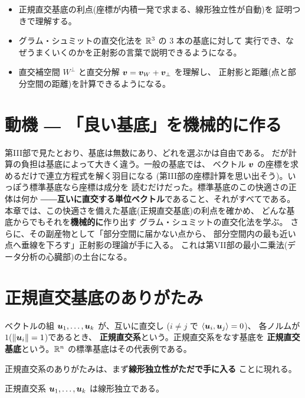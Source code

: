 \begin{goal}
\begin{itemize}
\item 正規直交基底の利点(座標が内積一発で求まる、線形独立性が自動)を
証明つきで理解する。
\item グラム・シュミットの直交化法を $\mathbb{R}^3$ の $3$ 本の基底に対して
実行でき、なぜうまくいくのかを正射影の言葉で説明できるようになる。
\item 直交補空間 $W^{\perp}$ と直交分解
$\bm{v} = \bm{v}_W + \bm{v}_{\perp}$ を理解し、
正射影と距離(点と部分空間の距離)を計算できるようになる。
\end{itemize}
\end{goal}

\section{動機 ― 「良い基底」を機械的に作る}

第III部で見たとおり、基底は無数にあり、どれを選ぶかは自由である。
だが計算の負担は基底によって大きく違う。一般の基底では、
ベクトル $\bm{v}$ の座標を求めるだけで連立方程式を解く羽目になる
(第III部の座標計算を思い出そう)。いっぽう標準基底なら座標は成分を
読むだけだった。標準基底のこの快適さの正体は何か
――\textbf{互いに直交する単位ベクトル}であること、それがすべてである。
本章では、この快適さを備えた基底(正規直交基底)の利点を確かめ、
どんな基底からでもそれを\textbf{機械的に}作り出す
グラム・シュミットの直交化法を学ぶ。
さらに、その副産物として「部分空間に届かない点から、
部分空間内の最も近い点へ垂線を下ろす」正射影の理論が手に入る。
これは第VII部の最小二乗法(データ分析の心臓部)の土台になる。

\section{正規直交基底のありがたみ}

\begin{teigi}[正規直交基底]\label{def:gs-onb}
ベクトルの組 $\bm{u}_1, \dots, \bm{u}_k$ が、互いに直交し
($i \neq j$ で $\langle \bm{u}_i, \bm{u}_j \rangle = 0$)、
各ノルムが $1$($\|\bm{u}_i\| = 1$)であるとき、
\textbf{正規直交系}という。正規直交系をなす基底を
\textbf{正規直交基底}という。$\mathbb{R}^n$ の標準基底はその代表例である。
\end{teigi}

正規直交系のありがたみは、まず\textbf{線形独立性がただで手に入る}
ことに現れる。

\begin{teiri}[正規直交系は線形独立]\label{thm:gs-indep}
正規直交系 $\bm{u}_1, \dots, \bm{u}_k$ は線形独立である。
\end{teiri}

